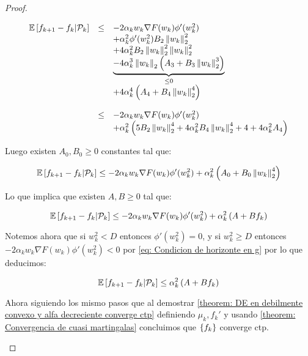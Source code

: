 \begin{proof}
\begin{enumerate}
		\begin{equation*}
		\begin{array}{rcl}
		\mathbb{E} \left[{f_{k+1} - f_k} \vert \mathcal{P}_{k}\right] & \leq & -2 \alpha_k w_k \nabla F (w_k)\phi'(w_k^2) \\ 
		&& + \alpha_k^2 \phi'(w_k^2) B_2\left\lVert w_k\right\rVert_2^2 \\ 
		& & + 4 \alpha_k^2 B_2\left\lVert w_k\right\rVert_2^2 \left\lVert w_k\right\rVert_2^2 \\
		& & \underbrace{-4 \alpha_k^3 \left\lVert w_k\right\rVert_2 \left(A_3 + B_3 \left\lVert w_k\right\rVert_2^3\right)}_{\leq 0}\\
		& & + 4 \alpha_k^4 \left(A_4 + B_4 \left\lVert w_k\right\rVert_2^4\right)\\
		& & \\
		& \leq & -2 \alpha_k w_k \nabla F (w_k)\phi'(w_k^2)  \\
		& & + \alpha_k^2 \left(5B_2 \left\lVert w_k\right\rVert_2^4 + 4 \alpha_k^2 B_4 \left\lVert w_k\right\rVert_2^4 + 4 + 4 \alpha_k^2 A_4\right)
		\end{array} 
		\end{equation*}
		
		Luego existen $A_0, B_0 \geq 0$ constantes tal que:
		
		\begin{equation*}
		\mathbb{E} \left[{f_{k+1} - f_k} \vert \mathcal{P}_{k}\right] \leq -2 \alpha_k w_k \nabla F (w_k)\phi'(w_k^2) + \alpha_k^2 \left(A_0 + B_0 \left\lVert w_k\right\rVert_2^4\right)
		\end{equation*}
		
		 Lo que implica que existen $A,B \geq 0$ tal que:
		
		\begin{equation*}
		\mathbb{E} \left[{f_{k+1} - f_k} \vert \mathcal{P}_{k}\right] \leq -2 \alpha_k w_k \nabla F (w_k)\phi'(w_k^2)  + \alpha_k^2\left(A + B f_k\right)
		\end{equation*}
		
		Notemos ahora que si $w_k^2 < D$ entonces $\phi'(w_k^2) = 0$, y si $w_k^2 \geq D$ entonces $-2 \alpha_k w_k \nabla F (w_k)\phi'(w_k^2) < 0$ por \ref{eq: Condicion de horizonte en g} por lo que deducimos:
		
		\begin{equation}
		\mathbb{E} \left[{f_{k+1} - f_k} \vert \mathcal{P}_{k}\right] \leq \alpha_k^2\left(A + B f_k\right)
		\end{equation}	
		
		Ahora siguiendo los mismo pasos que al demostrar \ref{theorem: DE en debilmente convexo y alfa decreciente converge ctp} definiendo $\mu_k, f_k'$ y usando \ref{theorem: Convergencia de cuasi martingalas} concluimos que $\left\lbrace f_k\right\rbrace$ converge ctp.
		

\end{enumerate}
\end{proof}
